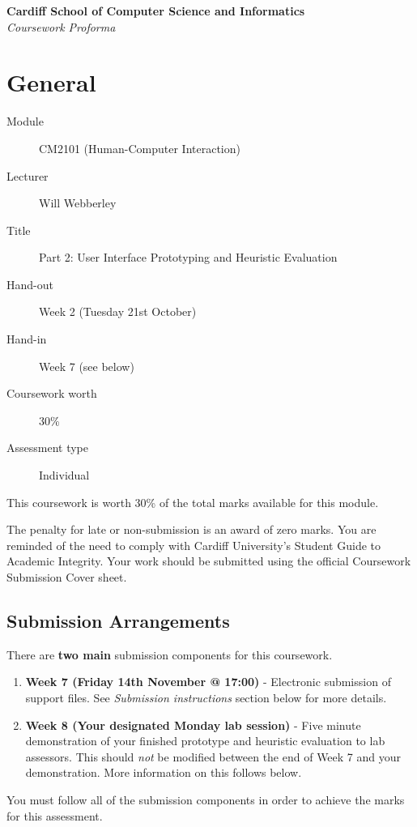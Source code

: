 \documentclass[11pt,a4paper]{report}
\begin{document}
\Large\textbf{Cardiff School of Computer Science and Informatics}\\
\large\textit{Coursework Proforma}
\vskip15pt

\section*{General}

\begin{description}
    \item[Module] CM2101 (Human-Computer Interaction)
    \item[Lecturer] Will Webberley
    \item[Title] Part 2: User Interface Prototyping and Heuristic Evaluation
    \item[Hand-out] Week 2 (Tuesday 21st October)
    \item[Hand-in] Week 7 (see below)
    \item[Coursework worth] 30\%
    \item[Assessment type] Individual
\end{description}
This coursework is worth 30\% of the total marks available for this module.

The penalty for late or non-submission is an award of zero marks. You are reminded of the need to comply with Cardiff University's Student Guide to Academic Integrity. Your work should be submitted using the official Coursework Submission Cover sheet.

\subsection*{Submission Arrangements}
There are \textbf{two main} submission components for this coursework.
\begin{enumerate}
    \item \textbf{Week 7 (Friday 14th November @ 17:00)} - Electronic submission of support files. See \textit{Submission instructions} section below for more details.
    \item \textbf{Week 8 (Your designated Monday lab session)} - Five minute demonstration of your finished prototype and heuristic evaluation to lab assessors. This should \textit{not} be modified between the end of Week 7 and your demonstration. More information on this follows below.
\end{enumerate}
You must follow all of the submission components in order to achieve the marks for this assessment.
 
\end{document}
